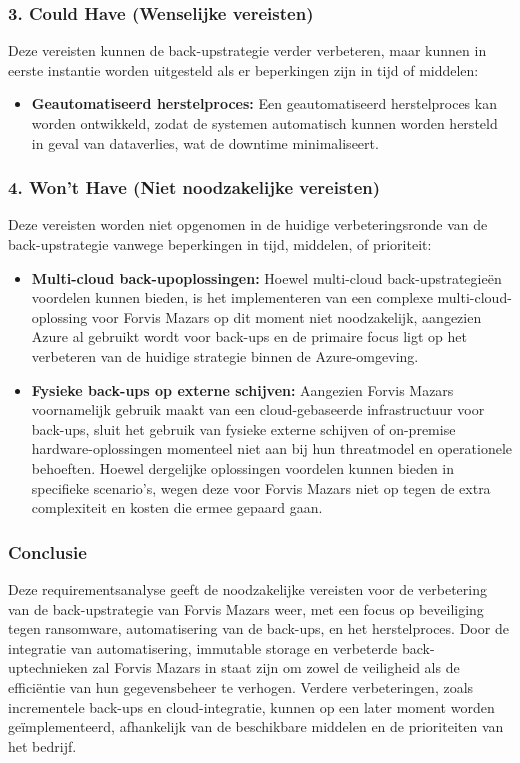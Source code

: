 \subsubsection{3. Could Have (Wenselijke vereisten)}
Deze vereisten kunnen de back-upstrategie verder verbeteren, maar kunnen in eerste instantie worden uitgesteld als er beperkingen zijn in tijd of middelen:

\begin{itemize}
    \item \textbf{Geautomatiseerd herstelproces:} Een geautomatiseerd herstelproces kan worden ontwikkeld, zodat de systemen automatisch kunnen worden hersteld in geval van dataverlies, wat de downtime minimaliseert.
\end{itemize}

\subsubsection{4. Won't Have (Niet noodzakelijke vereisten)}
Deze vereisten worden niet opgenomen in de huidige verbeteringsronde van de back-upstrategie vanwege beperkingen in tijd, middelen, of prioriteit:

\begin{itemize}
    \item \textbf{Multi-cloud back-upoplossingen:} Hoewel multi-cloud back-upstrategieën voordelen kunnen bieden, is het implementeren van een complexe multi-cloud-oplossing voor Forvis Mazars op dit moment niet noodzakelijk, aangezien Azure al gebruikt wordt voor back-ups en de primaire focus ligt op het verbeteren van de huidige strategie binnen de Azure-omgeving.
    
    \item \textbf{Fysieke back-ups op externe schijven:} Aangezien Forvis Mazars voornamelijk gebruik maakt van een cloud-gebaseerde infrastructuur voor back-ups, sluit het gebruik van fysieke externe schijven of on-premise hardware-oplossingen momenteel niet aan bij hun threatmodel en operationele behoeften. Hoewel dergelijke oplossingen voordelen kunnen bieden in specifieke scenario's, wegen deze voor Forvis Mazars niet op tegen de extra complexiteit en kosten die ermee gepaard gaan.
\end{itemize}

\subsubsection{Conclusie}
Deze requirementsanalyse geeft de noodzakelijke vereisten voor de verbetering van de back-upstrategie van Forvis Mazars weer, met een focus op beveiliging tegen ransomware, automatisering van de back-ups, en het herstelproces. Door de integratie van automatisering, immutable storage en verbeterde back-uptechnieken zal Forvis Mazars in staat zijn om zowel de veiligheid als de efficiëntie van hun gegevensbeheer te verhogen. Verdere verbeteringen, zoals incrementele back-ups en cloud-integratie, kunnen op een later moment worden geïmplementeerd, afhankelijk van de beschikbare middelen en de prioriteiten van het bedrijf.

